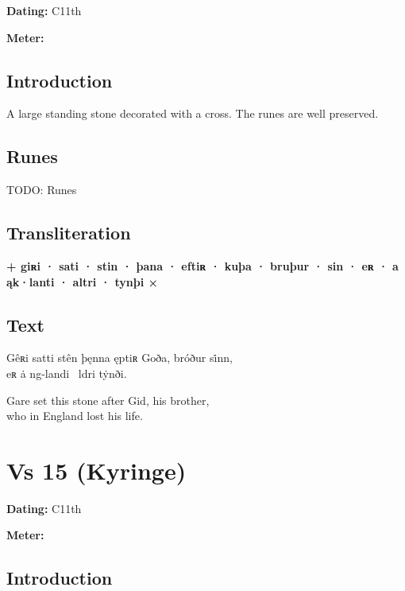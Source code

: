 \begin{flushright}%
\textbf{Dating:} C11th

\textbf{Meter:} \Fornyrdislag
\end{flushright}%

\subsection{Introduction}

A large standing stone decorated with a cross.  The runes are well preserved.

\subsection{Runes}

TODO: Runes%

\subsection{Transliteration}

\textbf{+ giʀi · sati · stin · þana · eftiʀ · kuþa · bruþur · sin · eʀ · a ąk·lanti · altri · tynþi ×}

\subsection{Text}

\bpg\bpa[0]%
\startsub Gêʀi satti stên þęnna ęptiʀ Goða, bróður si̇nn,\endsub \\
eʀ ȧ ng-landi \hld\ ldri tẏnði.\epa

\bpb Gare set this stone after Gid, his brother, \\
who in England lost his life.\epb\epg

\sectionline\clearpage


\section{Vs 15 (Kyringe)}

\begin{flushright}%
\textbf{Dating:} C11th

\textbf{Meter:} \Fornyrdislag
\end{flushright}%

\subsection{Introduction}


